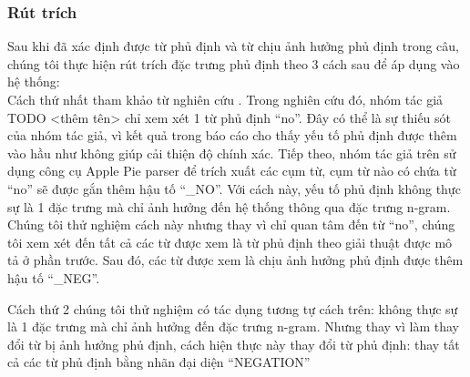 \subsubsection*{Rút trích}
Sau khi đã xác định được từ phủ định và từ chịu ảnh hưởng phủ định trong câu, chúng tôi thực hiện rút trích đặc trưng phủ định theo 3 cách sau để áp dụng vào hệ thống:\\


Cách thứ nhất tham khảo từ nghiên cứu \cite{niu2005analysis}. Trong nghiên cứu đó, nhóm tác giả \\TODO <thêm tên> chỉ xem xét 1 từ phủ định ``no''. Đây có thể là sự thiếu sót của nhóm tác giả, vì kết quả trong báo cáo \cite{niu2005analysis} cho thấy yếu tố phủ định được thêm vào hầu như không giúp cải thiện độ chính xác. Tiếp theo, nhóm tác giả trên sử dụng công cụ Apple Pie parser để trích xuất các cụm từ, cụm từ nào có chứa từ ``no'' sẽ được gắn thêm hậu tố ``\_NO''. Với cách này, yếu tố phủ định không thực sự là 1 đặc trưng mà chỉ ảnh hưởng đến hệ thống thông qua đặc trưng n-gram. Chúng tôi thử nghiệm cách này nhưng thay vì chỉ quan tâm đến từ ``no'', chúng tôi xem xét đến tất cả các từ được xem là từ phủ định theo giải thuật được mô tả ở phần trước. Sau đó, các từ được xem là chịu ảnh hưởng phủ định được thêm hậu tố ``\_NEG''.


Cách thứ 2 chúng tôi thử nghiệm có tác dụng tương tự cách trên: không thực sự là 1 đặc trưng mà chỉ ảnh hưởng đến đặc trưng n-gram. Nhưng thay vì làm thay đổi từ bị ảnh hưởng phủ định, cách hiện thực này thay  đổi từ phủ định: thay tất cả các từ phủ định bằng nhãn đại diện ``NEGATION''\\

